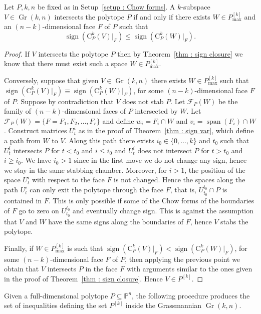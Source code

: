 \documentclass[english]{ourlematema}
\DeclareMathOperator{\Gr}{Gr}
\DeclareMathOperator{\spanv}{span}
\DeclareMathOperator{\sign}{sign}
\newcommand{\mF}{\mathcal{F}}
\newcommand{\PP}{\mathbb{P}}
\newcommand{\Pk}{P^{[k]}}
\newcommand{\Pkmax}{P^{[k]}_{\max}}
\newcommand{\CPk}{\mathrm{C}_P^k}
\begin{document}
\begin{thm}\label{thm : inequ}
    Let $P,k,n$ be fixed as in Setup~\ref{setup : Chow forms}. A $k$-subspace $V\in \Gr(k,n)$ intersects the polytope $P$ if and only if there exists $W\in \Pkmax$ and an $(n-k)$-dimensional face $F$ of $P$ such that
    \[ \sign(\CPk(V)|_F) \leq \sign(\CPk(W)|_F). \]
\end{thm}
\begin{proof}
    If $V$ intersects the polytope $P$ then by Theorem~\ref{thm : sign closure} we know that there must exist such a space $W\in \Pkmax$.

    Conversely, suppose that given $V\in \Gr(k,n)$ there exists $W\in \Pkmax$ such that
    $\sign(\CPk(V)|_F) \equiv \sign(\CPk(W)|_F)$, for some $(n-k)$-dimensional face $F$ of $P$. Suppose by contradiction that $V$ does not stab $P$. Let $\mF_P(W)$ be the family of $(n-k)$-dimensional faces of $P$ intersected by $W$. 
    Let $\mF_P(W) = \{ F=F_1, F_2, \ldots, F_r\}$ and define $w_i = F_i \cap W$ and $v_i = \spanv(F_i)\cap W$. 
    Construct matrices $U_t^i$ as in the proof of Theorem~\ref{thm : sign var}, which define a path from $W$ to $V$. 
    Along this path there exists $i_0\in \{0,\ldots,k\}$ and $t_0$ such that $U_t^i$ intersects $P$ for $t<t_0$ and $i\leq i_0$ and $U_t^i$ does not intersect $P$ for $t>t_0$ and $i\geq i_0$. 
    We have $i_0>1$ since in the first move we do not change any sign, hence we stay in the same stabbing chamber. Moreover, for $i>1$, the position of the space $U_t^i$ with respect to the face $F$ is not changed. Hence the spaces along the path $U_t^i$ can only exit the polytope through the face $F$, that is, $U_{t_0}^{i_0}\cap P$ is contained in $F$. This is only possible if some of the Chow forms of the boundaries of $F$ go to zero on $U_{t_0}^{i_0}$ and eventually change sign. This is against the assumption that $V$ and $W$ have the same signs along the boundaries of $F$, hence $V$ stabs the polytope.

    Finally, if $W\in \Pkmax$ is such that $\sign(\CPk(V)|_F) < \sign(\CPk(W)|_F)$, for some $(n-k)$-dimensional face $F$ of $P$, then applying the previous point we obtain that $V$ intersects $P$ in the face $F$ with arguments similar to the ones given in the proof of Theorem~\ref{thm : sign closure}. Hence $V\in \Pk$.
\end{proof}

Given a full-dimensional polytope $P\subseteq \PP^n$, the following procedure produces the set of inequalities defining the set $\Pk$ inside the Grassmannian $\Gr(k,n)$.
\end{document}
